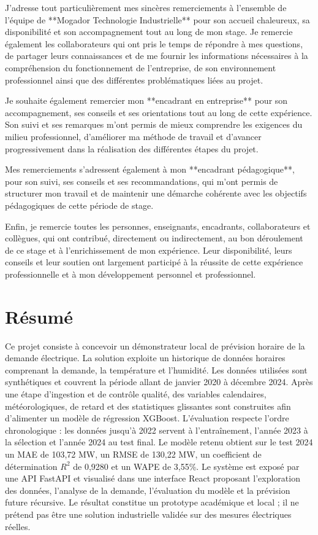 \documentclass[12pt,a4paper]{report}
\begin{document}
J’adresse tout particulièrement mes sincères remerciements à l’ensemble de l’équipe de **Mogador Technologie Industrielle** pour son accueil chaleureux, sa disponibilité et son accompagnement tout au long de mon stage. Je remercie également les collaborateurs qui ont pris le temps de répondre à mes questions, de partager leurs connaissances et de me fournir les informations nécessaires à la compréhension du fonctionnement de l’entreprise, de son environnement professionnel ainsi que des différentes problématiques liées au projet.

Je souhaite également remercier mon **encadrant en entreprise** pour son accompagnement, ses conseils et ses orientations tout au long de cette expérience. Son suivi et ses remarques m’ont permis de mieux comprendre les exigences du milieu professionnel, d’améliorer ma méthode de travail et d’avancer progressivement dans la réalisation des différentes étapes du projet.

Mes remerciements s’adressent également à mon **encadrant pédagogique**, pour son suivi, ses conseils et ses recommandations, qui m’ont permis de structurer mon travail et de maintenir une démarche cohérente avec les objectifs pédagogiques de cette période de stage.



Enfin, je remercie toutes les personnes, enseignants, encadrants, collaborateurs et collègues, qui ont contribué, directement ou indirectement, au bon déroulement de ce stage et à l’enrichissement de mon expérience. Leur disponibilité, leurs conseils et leur soutien ont largement participé à la réussite de cette expérience professionnelle et à mon développement personnel et professionnel.


\chapter*{Résumé}

Ce projet consiste à concevoir un démonstrateur local de prévision horaire de
la demande électrique. La solution exploite un historique de données horaires
comprenant la demande, la température et l'humidité. Les données utilisées
sont synthétiques et couvrent la période allant de janvier 2020 à décembre
2024. Après une étape d'ingestion et de contrôle qualité, des variables
calendaires, météorologiques, de retard et des statistiques glissantes sont
construites afin d'alimenter un modèle de régression XGBoost. L'évaluation
respecte l'ordre chronologique : les données jusqu'à 2022 servent à
l'entraînement, l'année 2023 à la sélection et l'année 2024 au test final.
Le modèle retenu obtient sur le test 2024 un MAE de 103,72 MW, un RMSE de
130,22 MW, un coefficient de détermination $R^2$ de 0,9280 et un WAPE de
3,55\%. Le système est exposé par une API FastAPI et visualisé dans une
interface React proposant l'exploration des données, l'analyse de la demande,
l'évaluation du modèle et la prévision future récursive. Le résultat constitue
un prototype académique et local ; il ne prétend pas être une solution
industrielle validée sur des mesures électriques réelles.
\end{document}
